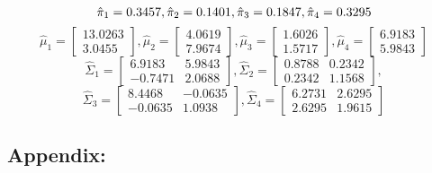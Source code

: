 \documentclass[a4paper]{article}
\begin{document}
\begin{equation}
	\hat{\pi}_1 = 0.3457, \hat{\pi}_2 = 0.1401, \hat{\pi}_3 = 0.1847, \hat{\pi}_4 = 0.3295\\
\end{equation}
\begin{equation}
	\hat{\mu}_1 = \begin{bmatrix} 13.0263 \\3.0455 \end{bmatrix},
	\hat{\mu}_2 = \begin{bmatrix} 4.0619 \\ 7.9674 \end{bmatrix}, 
	\hat{\mu}_3 = \begin{bmatrix} 1.6026 \\ 1.5717 \end{bmatrix}, 
	\hat{\mu}_4 = \begin{bmatrix} 6.9183 \\ 5.9843 \end{bmatrix}
\end{equation}
\begin{equation}
	\hat{\Sigma}_1 = \begin{bmatrix} 6.9183 & 5.9843 \\ -0.7471 & 2.0688 \end{bmatrix},
	\hat{\Sigma}_2 = \begin{bmatrix} 0.8788 & 0.2342 \\ 0.2342 & 1.1568 \end{bmatrix},
\end{equation}
\begin{equation}
	\hat{\Sigma}_3 = \begin{bmatrix} 8.4468 & -0.0635 \\ -0.0635 & 1.0938 \end{bmatrix},
	\hat{\Sigma}_4 = \begin{bmatrix} 6.2731 & 2.6295 \\ 2.6295 & 1.9615 \end{bmatrix}
\end{equation}

\newpage
\subsection*{Appendix:}
	
	
	
	
\end{document}
